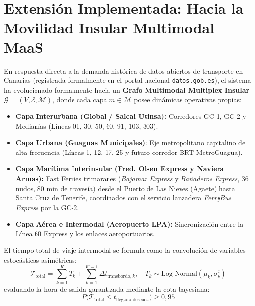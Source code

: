 \documentclass[11pt,a4paper,twoside]{report}
\begin{document}
\section{Extensión Implementada: Hacia la Movilidad Insular Multimodal MaaS}
En respuesta directa a la demanda histórica de datos abiertos de transporte en Canarias (registrada formalmente en el portal nacional \texttt{datos.gob.es}), el sistema ha evolucionado formalmente hacia un \textbf{Grafo Multimodal Multiplex Insular} $\mathcal{G} = (V, \mathcal{E}, \mathcal{M})$, donde cada capa $m \in \mathcal{M}$ posee dinámicas operativas propias:
\begin{itemize}
    \item \textbf{Capa Interurbana (Global / Salcai Utinsa):} Corredores GC-1, GC-2 y Medianías (Líneas 01, 30, 50, 60, 91, 103, 303).
    \item \textbf{Capa Urbana (Guaguas Municipales):} Eje metropolitano capitalino de alta frecuencia (Líneas 1, 12, 17, 25 y futuro corredor BRT MetroGuagua).
    \item \textbf{Capa Marítima Interinsular (Fred. Olsen Express y Naviera Armas):} Fast Ferries trimaranes (\textit{Bajamar Express} y \textit{Bañaderos Express}, 36 nudos, 80 min de travesía) desde el Puerto de Las Nieves (Agaete) hasta Santa Cruz de Tenerife, coordinados con el servicio lanzadera \textit{FerryBus Express} por la GC-2.
    \item \textbf{Capa Aérea e Intermodal (Aeropuerto LPA):} Sincronización entre la Línea 60 Express y los enlaces aeroportuarios.
\end{itemize}

El tiempo total de viaje intermodal se formula como la convolución de variables estocásticas asimétricas:
\begin{equation}
\mathcal{T}_{\text{total}} = \sum_{k=1}^K T_k + \sum_{k=1}^{K-1} \Delta t_{\text{transbordo}, k}, \quad T_k \sim \text{Log-Normal}(\mu_k, \sigma_k^2)
\end{equation}
evaluando la hora de salida garantizada mediante la cota bayesiana:
\begin{equation}
P\Big(\mathcal{T}_{\text{total}} \le t_{\text{llegada\_deseada}}\Big) \ge 0,95
\end{equation}
\end{document}
